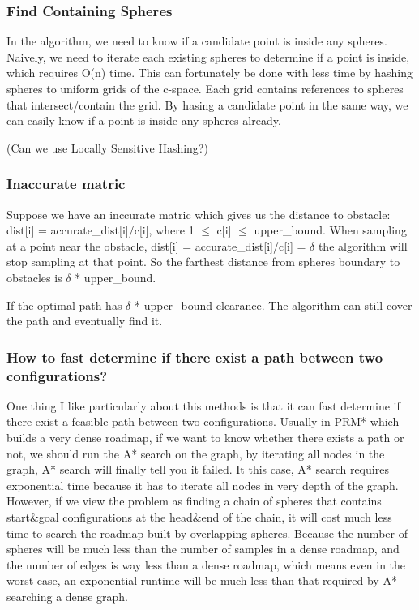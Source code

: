 \documentclass{article}
\begin{document}
 		\subsubsection{Find Containing Spheres}
 			In the algorithm, we need to know if a candidate point is inside any spheres. Naively, we need to iterate each existing spheres to determine if a point is inside, which requires O(n) time. This can fortunately be done with less time by hashing spheres to uniform grids of the c-space. Each grid contains references to spheres that intersect/contain the grid. By hasing a candidate point in the same way, we can easily know if a point is inside any spheres already.

 			(Can we use Locally Sensitive Hashing?)  

 		\subsubsection{Inaccurate matric}
			Suppose we have an inccurate matric which gives us the distance to obstacle:
 			dist[i] = accurate\_dist[i]/c[i], where 1 $\leq$ c[i] $\leq$ upper\_bound. When sampling at a point near the obstacle, dist[i] = accurate\_dist[i]/c[i] = $\delta$ the algorithm will stop sampling at that point. So the farthest distance from spheres boundary to obstacles is $\delta$ * upper\_bound. 

 			If the optimal path has $\delta$ * upper\_bound clearance. The algorithm can still cover the path and eventually find it.

                \subsubsection{How to fast determine if there exist a path between two configurations?}
                        One thing I like particularly about this methods is that it can fast determine if there exist a feasible path between two configurations. Usually in PRM* which builds a very dense roadmap, if we want to know whether there exists a path or not, we should run the A* search on the graph, by iterating all nodes in the graph, A* search will finally tell you it failed. It this case, A* search requires exponential time because it has to iterate all nodes in very depth of the graph. 
                        However, if we view the problem as finding a chain of spheres that contains start&goal configurations at the head&end of the chain, it will cost much less time to search the roadmap built by overlapping spheres. Because the number of spheres will be much less than the number of samples in a dense roadmap, and the number of edges is way less than a dense roadmap, which means even in the worst case, an exponential runtime will be much less than that required by A* searching a dense graph. 
   
\end{document}
